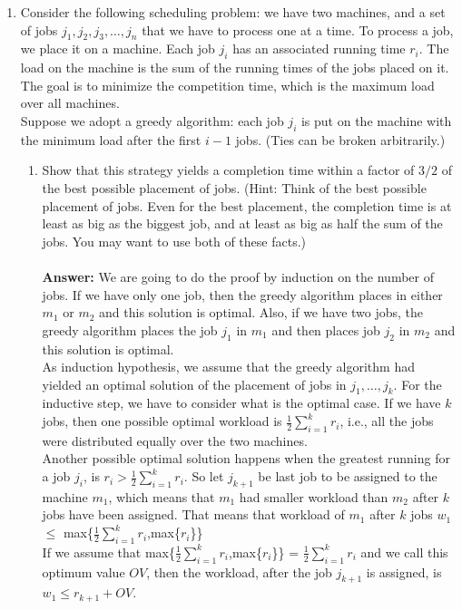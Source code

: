 \documentclass[tikz, 12pt]{scrartcl}
\begin{document}
\begin{enumerate}
	\item Consider the following scheduling problem: we have two machines, and a set of jobs $j_1, j_2, j_3, \ldots, j_n$ that we have to process one at a time. To process a job, we place it on a machine. Each job $j_i$ has an associated running time $r_i$. The load on the machine is the sum of the running times of the jobs placed on it. The goal is to minimize the competition time, which is the maximum load over all machines.\\
	Suppose we adopt a greedy algorithm: each job $j_i$ is put on the machine with the minimum load after the first $i - 1$ jobs. (Ties can be broken arbitrarily.) 
	\begin{enumerate}
	\item Show that this strategy yields a completion time within a factor of $3/2$ of the best possible placement of jobs. (Hint: Think of the best possible placement of jobs. Even for the best placement, the completion time is at least as big as the biggest job, and at least as big as half the sum of the jobs. You may want to use both of these facts.)\\
	\\
	\textbf{Answer: }  We are going to do the proof by induction on the number of jobs. If we have only one job, then the greedy algorithm places in either $m_1$ or $m_2$ and this solution is optimal. Also, if we have two jobs, the greedy algorithm places the job $j_1$ in $m_1$ and then places job $j_2$ in $m_2$ and this solution is optimal.\\
	As induction hypothesis, we assume that the greedy algorithm had yielded an optimal solution of the placement of jobs in $j_1,\ldots, j_k $. For the inductive step, we have to consider what is the optimal case. If we have $k$ jobs, then one possible optimal workload is $\frac{1}{2}\sum_{i = 1}^{k} r_i$, i.e., all the jobs were distributed equally over the two machines. \\
	Another possible optimal solution happens when the greatest running for a job $j_i$, is $r_i > \frac{1}{2}\sum_{i = 1}^{k} r_i$. So let $j_{k+1}$ be last job to be assigned to the machine $m_1$, which means that $m_1$ had smaller workload than $m_2$ after $k$ jobs have been assigned. That means that workload of $m_1$ after $k$ jobs $w_1$ $\leq $ max\{$\frac{1}{2}\sum_{i = 1}^{k} r_i$,max\{$r_i$\}\}\\
	If we assume that max\{$\frac{1}{2}\sum_{i = 1}^{k} r_i$,max\{$r_i$\}\} = $\frac{1}{2}\sum_{i = 1}^{k} r_i$ and we call this optimum value $OV$, then the workload, after the job $j_{k+1}$ is assigned, is $w_1 \leq r_{k+1} + OV$.\\

\end{enumerate}
\end{enumerate}
\end{document}
